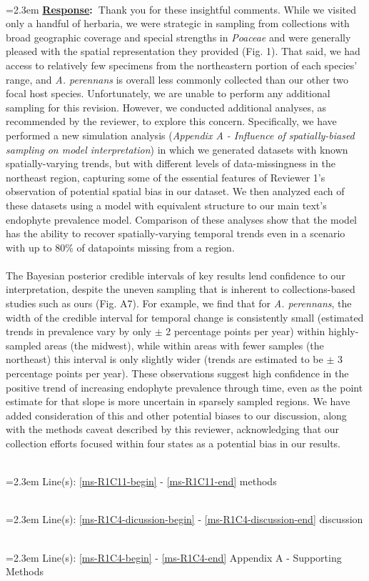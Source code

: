 \documentclass[12pt]{article}
\newcommand{\response}[1]{
	\\[0.25em]
	\hangindent=2.3em \textbf{\textcolor{NavyBlue}{\uline{Response}:~}}#1
	}
\newcommand{\linesref}[2]{
		\\[0.25em]
	\hangindent=2.3em {\color{Mahogany} Line(s): \ref{#1} - \ref{#2}}
}
\newcommand{\jacob}[2]{{\color{blue}{#1}}\footnote{\textit{\color{blue}{#2}}}}
\begin{document}
\response{Thank you for these insightful comments. 
While we visited only a handful of herbaria, we were strategic in sampling from collections with broad geographic coverage and special strengths in \emph{Poaceae} and were generally pleased with the spatial representation they provided (Fig. 1). 
That said, we had access to relatively few specimens from the northeastern portion of each species' range, and \emph{A. perennans} is overall less commonly collected than our other two focal host species. 
Unfortunately, we are unable to perform any additional sampling for this revision. 
However, we conducted additional analyses, as recommended by the reviewer, to explore this concern. 
Specifically, we have performed a new simulation analysis (\emph{Appendix A - Influence of spatially-biased sampling on model interpretation}) in which we generated datasets with known spatially-varying trends, but with different levels of data-missingness in the northeast region, capturing some of the essential features of Reviewer 1's observation of potential spatial bias in our dataset. 
We then analyzed each of these datasets using a model with equivalent structure to our main text's endophyte prevalence model.
Comparison of these analyses show that the model has the ability to recover spatially-varying temporal trends even in a scenario with up to $80$\% of datapoints missing from a region. 
\\
\\	
The Bayesian posterior credible intervals of key results lend confidence to our interpretation, despite the uneven sampling that is inherent to collections-based studies such as ours (Fig. A7). 
For example, we find that for \emph{A. perennans}, the width of the credible interval for temporal change is consistently small (estimated trends in prevalence vary by only $\pm$ 2 percentage points per year) within highly-sampled areas (the midwest), while within areas with fewer samples (the northeast) this interval is only slightly wider (trends are estimated to be $\pm$ 3 percentage points per year).
These observations suggest high confidence in the positive trend of increasing endophyte prevalence through time, even as the point estimate for that slope is more uncertain in sparsely sampled regions. 
We have added consideration of this and other potential biases to our discussion, along with the methods caveat described by this reviewer, acknowledging that our collection efforts focused within four states as a potential bias in our results.
\linesref{ms-R1C11-begin}{ms-R1C11-end} methods
\linesref{ms-R1C4-dicussion-begin}{ms-R1C4-discussion-end} discussion
\linesref{ms-R1C4-begin}{ms-R1C4-end} Appendix A - Supporting Methods
}
\end{document}
